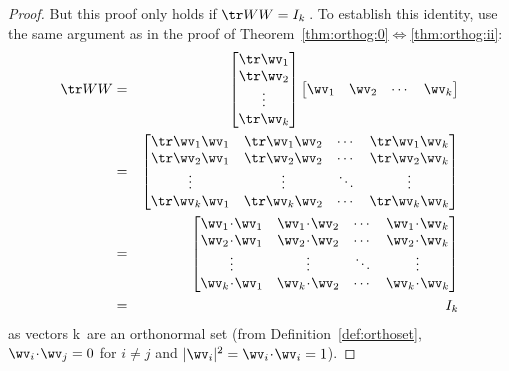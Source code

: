 \begin{proof}
But this proof only holds if \(\tr WW=I_k\)\,.
To establish this identity, use the same argument as in the proof of Theorem~\ref{thm:orthog:0}$\iff$\ref{thm:orthog:ii}:
\begin{eqnarray*}
\tr WW
&=&\begin{bmatrix} \tr\wv_1\\\tr\wv_2\\\vdots\\\tr\wv_k \end{bmatrix}
\begin{bmatrix} \wv_1&\wv_2&\cdots&\wv_k \end{bmatrix}
\\&=&\begin{bmatrix} \tr\wv_1\wv_1&\tr\wv_1\wv_2&\cdots&\tr\wv_1\wv_k 
\\ \tr\wv_2\wv_1&\tr\wv_2\wv_2&\cdots&\tr\wv_2\wv_k 
\\\vdots&\vdots&\ddots&\vdots
\\ \tr\wv_k\wv_1&\tr\wv_k\wv_2&\cdots&\tr\wv_k\wv_k \end{bmatrix}
\\&=&\begin{bmatrix} \wv_1\cdot\wv_1&\wv_1\cdot\wv_2&\cdots&\wv_1\cdot\wv_k 
\\ \wv_2\cdot\wv_1&\wv_2\cdot\wv_2&\cdots&\wv_2\cdot\wv_k 
\\\vdots&\vdots&\ddots&\vdots
\\ \wv_k\cdot\wv_1&\wv_k\cdot\wv_2&\cdots&\wv_k\cdot\wv_k \end{bmatrix}
\\&=&I_k
\end{eqnarray*}
as vectors \hlist\wv k\ are an orthonormal set (from Definition~\ref{def:orthoset}, \(\wv_i\cdot\wv_j=0\) for \(i\neq j\) and \(|\wv_i|^2=\wv_i\cdot\wv_i=1\)).

\end{proof}
